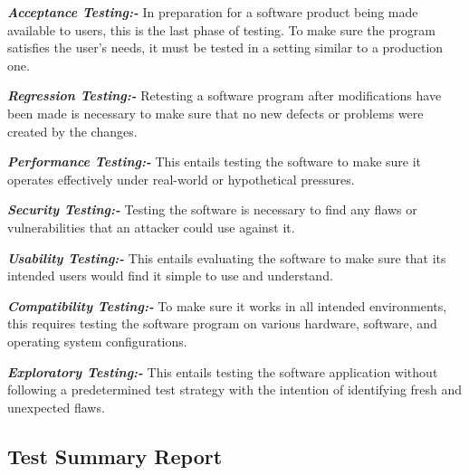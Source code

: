 \textbf{\textit{Acceptance Testing:-}} In preparation for a software product being made available to 
users, this is the last phase of testing. To make sure the program satisfies the user's 
needs, it must be tested in a setting similar to a production one. 

\textbf{\textit{Regression Testing:-}} Retesting a software program after modifications have been made 
is necessary to make sure that no new defects or problems were created by the changes. 

\textbf{\textit{Performance Testing:-}} This entails testing the software to make sure it operates 
effectively under real-world or hypothetical pressures. 

\textbf{\textit{Security Testing:-}} Testing the software is necessary to find any flaws or vulnerabilities 
that an attacker could use against it. 

\textbf{\textit{Usability Testing:-}} This entails evaluating the software to make sure that its intended 
users would find it simple to use and understand. 

\textbf{\textit{Compatibility Testing:-}} To make sure it works in all intended environments, this 
requires testing the software program on various hardware, software, and operating 
system configurations. 

\textbf{\textit{Exploratory Testing:-}} This entails testing the software application without following a 
predetermined test strategy with the intention of identifying fresh and unexpected flaws.

\subsection{Test Summary Report}

